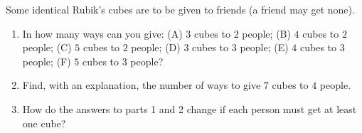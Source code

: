 Some identical Rubik's cubes are to be given to friends (a friend may get none).
\begin{enumerate}
\item In how many ways can you give: (A) $3$ cubes to $2$ people; (B) $4$ cubes to $2$ people; (C) $5$ cubes to $2$ people; (D) $3$ cubes to $3$ people; (E) $4$ cubes to $3$ people; (F) $5$ cubes to $3$ people?
\item Find, with an explanation, the number of ways to give $7$ cubes to $4$ people.
\item How do the answers to parts 1 and 2 change if each person must get at least one cube?
\end{enumerate}
